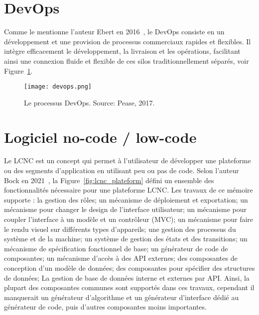 


\section{DevOps}\label{devops_ref}

Comme le mentionne l'auteur Ebert en 2016~\cite{ebert2016devops}, le DevOps consiste en un développement et une provision de processus commerciaux rapides et flexibles. Il intègre efficacement le développement, la livraison et les opérations, facilitant ainsi une connexion fluide et flexible de ces silos traditionnellement séparés, voir Figure~\ref{fig:devops}.

\begin{figure}[htb]
\centering
\texttt{[image: devops.png]}
\caption{Le processus DevOps. Source: Pease, 2017.~\cite{devops_illustration}}
\label{fig:devops}
\end{figure}


\section{Logiciel no-code / low-code}


Le LCNC est un concept qui permet à l’utilisateur de développer une plateforme ou des segments d'application en utilisant peu ou pas de code. Selon l'auteur Bock en 2021~\cite{LC_bock_2021}, la Figure~\ref{fig:lcnc_plateform} défini un ensemble des fonctionnalités nécessaire pour une plateforme LCNC. Les travaux de ce mémoire supporte : la gestion des rôles; un mécanisme de déploiement et exportation; un mécanisme pour changer le design de l'interface utilisateur; un mécanisme pour coupler l'interface à un modèle et un contrôleur (MVC); un mécanisme pour faire le rendu visuel sur différents types d'appareils; une gestion des processus du système et de la machine; un système de gestion des états et des transitions; un mécanisme de spécification fonctionnel de base; un générateur de code de composantes; un mécanisme d'accès à des API externes; des composantes de conception d'un modèle de données; des composantes pour spécifier des structures de données; La gestion de base de données interne et externes par API. Ainsi, la plupart des composantes communes sont supportés dans ces travaux, cependant il manquerait un générateur d'algorithme et un générateur d'interface dédié au générateur de code, puis d'autres composantes moins importantes.

